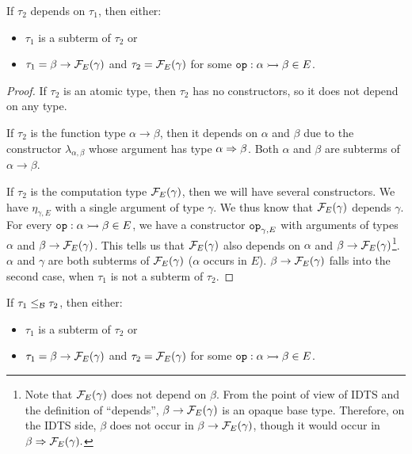 \begin{observation}\label{obs:base-type-depends}
  If $\tau_2$ depends on $\tau_1$, then either:

  \begin{itemize}
  \item $\tau_1$ is a subterm of $\tau_2$ or
  \item $\tau_1 = \beta \to \mathcal{F}_E(\gamma)$ and $\tau_2 = \mathcal{F}_E(\gamma)$ for
    some $\mathtt{op} : \alpha \rightarrowtail \beta \in E$.
  \end{itemize}
\end{observation}
\begin{proof}
  If $\tau_2$ is an atomic type, then $\tau_2$ has no constructors, so it
  does not depend on any type.

  If $\tau_2$ is the function type $\alpha \to \beta$, then it depends on
  $\alpha$ and $\beta$ due to the constructor $\lambda_{\alpha, \beta}$
  whose argument has type $\alpha \Rightarrow \beta$. Both $\alpha$ and $\beta$ are
  subterms of $\alpha \to \beta$.
  
  If $\tau_2$ is the computation type $\mathcal{F}_E(\gamma)$, then we will have
  several constructors. We have $\eta_{\gamma,E}$ with a single argument of
  type $\gamma$. We thus know that $\mathcal{F}_E(\gamma)$ depends $\gamma$. For
  every $\mathtt{op} : \alpha \rightarrowtail \beta \in E$, we have a constructor
  $\mathtt{op}_{\gamma,E}$ with arguments of types $\alpha$ and
  $\beta \to \mathcal{F}_E(\gamma)$. This tells us that $\mathcal{F}_E(\gamma)$ also
  depends on $\alpha$ and $\beta \to \mathcal{F}_E(\gamma)$\footnote{Note that
    $\mathcal{F}_E(\gamma)$ does not depend on $\beta$. From the point of view of
    IDTS and the definition of ``depends'', $\beta \to \mathcal{F}_E(\gamma)$ is an
    opaque base type. Therefore, on the IDTS side, $\beta$ does not occur
    in $\beta \to \mathcal{F}_E(\gamma)$, though it would occur in
    $\beta \Rightarrow \mathcal{F}_E(\gamma).$}. $\alpha$ and $\gamma$ are both subterms of
  $\mathcal{F}_E(\gamma)$ ($\alpha$ occurs in $E$).  $\beta \to \mathcal{F}_E(\gamma)$
  falls into the second case, when $\tau_1$ is not a subterm of $\tau_2$.
\end{proof}

\begin{corollary}\label{cor:base-type-le}
  If $\tau_1 \le_{\mathcal{B}} \tau_2$, then either:

  \begin{itemize}
  \item $\tau_1$ is a subterm of $\tau_2$ or
  \item $\tau_1 = \beta \to \mathcal{F}_E(\gamma)$ and $\tau_2 = \mathcal{F}_E(\gamma)$ for
    some $\mathtt{op} : \alpha \rightarrowtail \beta \in E$.
  \end{itemize}
\end{corollary}

